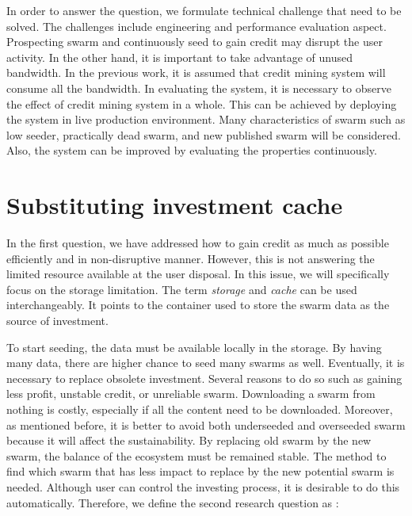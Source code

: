 	
In order to answer the question, we formulate technical challenge that need to be solved. The challenges include engineering and performance evaluation aspect. Prospecting swarm and continuously seed to gain credit may disrupt the user activity. In the other hand, it is important to take advantage of unused bandwidth. In the previous work, it is assumed that credit mining system will consume all the bandwidth. In evaluating the system, it is necessary to observe the effect of credit mining system in a whole. This can be achieved by deploying the system in live production environment. Many characteristics of swarm such as low seeder, practically dead swarm, and new published swarm will be considered. Also, the system can be improved by evaluating the properties continuously.

\section{Substituting investment cache}
In the first question, we have addressed how to gain credit as much as possible efficiently and in non-disruptive manner. However, this is not answering the limited resource available at the user disposal. In this issue, we will specifically focus on the storage limitation. The term \textit{storage} and \textit{cache} can be used interchangeably. It points to the container used to store the swarm data as the source of investment.

To start seeding, the data must be available locally in the storage. By having many data, there are higher chance to seed many swarms as well. Eventually, it is necessary to replace obsolete investment. Several reasons to do so such as gaining less profit, unstable credit, or unreliable swarm. Downloading a swarm from nothing is costly, especially if all the content need to be downloaded. Moreover, as mentioned before, it is better to avoid both underseeded and overseeded swarm because it will affect the sustainability. By replacing old swarm by the new swarm, the balance of the ecosystem must be remained stable. The method to find which swarm that has less impact to replace by the new potential swarm is needed. Although user can control the investing process, it is desirable to do this automatically. Therefore, we define the second research question as : 

